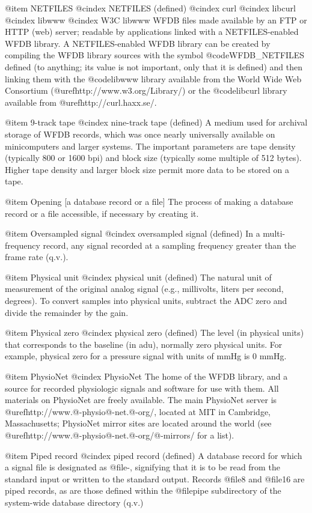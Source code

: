 {{{{{{{{{@item NETFILES
@cindex NETFILES (defined)
@cindex curl
@cindex libcurl
@cindex libwww
@cindex W3C libwww
WFDB files made available by an FTP or HTTP (web) server;  readable
by applications linked with a NETFILES-enabled WFDB library.  A
NETFILES-enabled WFDB library can be created by compiling the WFDB
library sources with the symbol @code{WFDB_NETFILES} defined (to anything;
its value is not important, only that it is defined) and then linking
them with the @code{libwww} library available from the World Wide Web
Consortium (@uref{http://www.w3.org/Library/}) or the @code{libcurl}
library available from @uref{http://curl.haxx.se/}.

@item 9-track tape
@cindex nine-track tape (defined)
A medium used for archival storage of WFDB records, which was once nearly
universally available on minicomputers and larger systems.  The
important parameters are tape density (typically 800 or 1600 bpi) and
block size (typically some multiple of 512 bytes).  Higher tape density
and larger block size permit more data to be stored on a tape.

@item Opening [a database record or a file]
The process of making a database record or a file accessible, if
necessary by creating it.

@item Oversampled signal
@cindex oversampled signal (defined)
In a multi-frequency record, any signal recorded at a sampling frequency
greater than the frame rate (q.v.).

@item Physical unit
@cindex physical unit (defined)
The natural unit of measurement of the original analog signal (e.g.,
millivolts, liters per second, degrees).  To convert samples into
physical units, subtract the ADC zero and divide the remainder by the
gain.

@item Physical zero
@cindex physical zero (defined)
The level (in physical units) that corresponds to the baseline (in adu),
normally zero physical units.  For example, physical zero for a pressure
signal with units of mmHg is 0 mmHg.

@item PhysioNet
@cindex PhysioNet
The home of the WFDB library, and a source for recorded physiologic signals and
software for use with them.  All materials on PhysioNet are freely available.
The main PhysioNet server is @uref{http://www.@-physio@-net.@-org/}, located at
MIT in Cambridge, Massachusetts; PhysioNet mirror sites are located around the
world (see @uref{http://www.@-physio@-net.@-org/@-mirrors/} for a list).

@item Piped record
@cindex piped record (defined)
A database record for which a signal file is designated as @file{-},
signifying that it is to be read from the standard input or written to
the standard output.  Records @file{8} and @file{16} are piped
records, as are those defined within the @file{pipe} subdirectory of
the system-wide database directory (q.v.)

}}}}}}}}}
